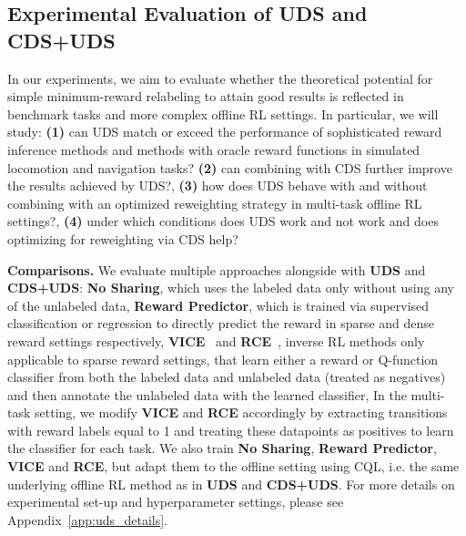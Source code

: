 
\newcommand{\CC}{\cellcolor{Gray}}

\vspace{-0.2cm}
\subsection{Experimental Evaluation of UDS and CDS+UDS}
\label{sec:uds_exp}
\vspace{-0.2cm}
In our experiments, we aim to evaluate whether the theoretical potential for simple minimum-reward relabeling to attain good results is reflected in benchmark tasks and more complex offline RL settings. In particular, we will study: \textbf{(1)} can UDS match or exceed the performance of sophisticated reward inference methods and methods with oracle reward functions in simulated locomotion and navigation tasks? \textbf{(2)} can combining with CDS further improve the results achieved by UDS?, \textbf{(3)} how does UDS behave with and without combining with an optimized reweighting strategy in multi-task offline RL settings?, \textbf{(4)} under which conditions does UDS work and not work and does optimizing for reweighting via CDS help?


\textbf{Comparisons.} 
We evaluate multiple approaches alongside with \textbf{UDS} and \textbf{CDS+UDS}:
\textbf{No Sharing}, which uses the labeled data only without using any of the unlabeled data, \textbf{Reward Predictor}, which is trained via supervised classification or regression to directly predict the reward in sparse and dense reward settings respectively, \textbf{VICE}~\citep{fu2018variational} and \textbf{RCE}~\citep{eysenbach2021replacing}, inverse RL methods only applicable to sparse reward settings, that learn either a reward or Q-function classifier from both the labeled data and unlabeled data (treated as negatives) and then annotate the unlabeled data with the learned classifier, 
In the multi-task setting, we modify \textbf{VICE} and \textbf{RCE} accordingly by extracting transitions with reward labels equal to 1 and treating these datapoints as positives to learn the classifier for each task. We also train \textbf{No Sharing}, \textbf{Reward Predictor}, \textbf{VICE} and \textbf{RCE}, but adapt them to the offline setting using CQL, i.e. the same underlying offline RL method as in \textbf{UDS} and \textbf{CDS+UDS}.
For more details on experimental set-up and hyperparameter settings, please see Appendix~\ref{app:uds_details}. 


